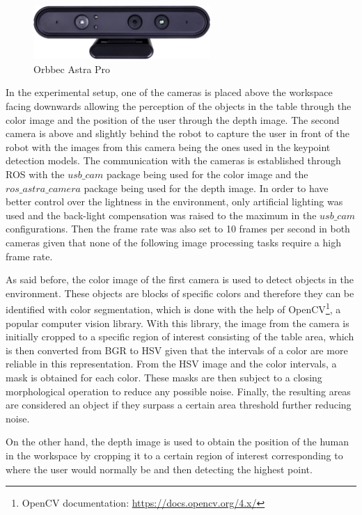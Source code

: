 \begin{figure}[ht]
\centerline{\includegraphics[width=0.6\textwidth]{figs/AstraPro.jpg}}
\caption[Orbbec Astra Pro]{Orbbec Astra Pro \cite{AstraPro}}
\label{fig:orbbec_astra_pro}
\end{figure}

In the experimental setup, one of the cameras is placed above the workspace facing downwards allowing the perception of the objects in the table through the color image and the position of the user through the depth image. The second camera is above and slightly behind the robot to capture the user in front of the robot with the images from this camera being the ones used in the keypoint detection models. The communication with the cameras is established through ROS with the $usb\_cam$ package being used for the color image and the $ros\_astra\_camera$ package being used for the depth image. In order to have better control over the lightness in the environment, only artificial lighting was used and the back-light compensation was raised to the maximum in the $usb\_cam$ configurations. Then the frame rate was also set to 10 frames per second in both cameras given that none of the following image processing tasks require a high frame rate.

As said before, the color image of the first camera is used to detect objects in the environment. These objects are blocks of specific colors and therefore they can be identified with color segmentation, which is done with the help of OpenCV\footnote{OpenCV documentation: \url{https://docs.opencv.org/4.x/}}, a popular computer vision library. With this library, the image from the camera is initially cropped to a specific region of interest consisting of the table area, which is then converted from BGR to HSV given that the intervals of a color are more reliable in this representation. From the HSV image and the color intervals, a mask is obtained for each color. These masks are then subject to a closing morphological operation to reduce any possible noise. Finally, the resulting areas are considered an object if they surpass a certain area threshold further reducing noise.

On the other hand, the depth image is used to obtain the position of the human in the workspace by cropping it to a certain region of interest corresponding to where the user would normally be and then detecting the highest point.

